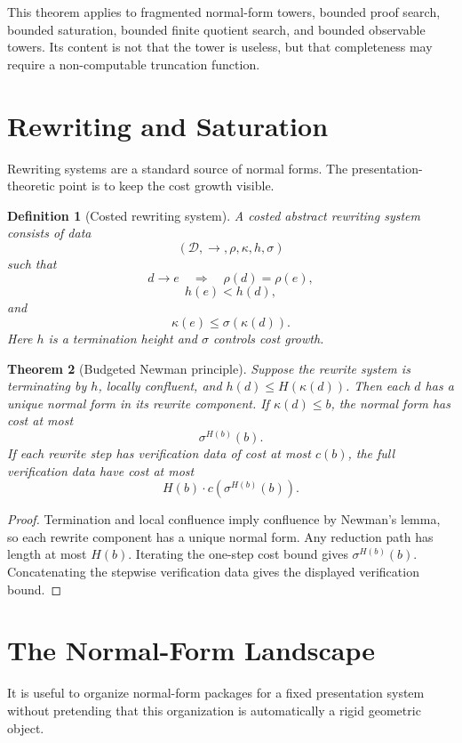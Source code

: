 \documentclass[11pt]{article}
\newtheorem{theorem}{Theorem}[section]
\newtheorem{definition}[theorem]{Definition}
\begin{document}
This theorem applies to fragmented normal-form towers, bounded proof search, bounded saturation, bounded finite quotient search, and bounded observable towers. Its content is not that the tower is useless, but that completeness may require a non-computable truncation function.

\section{Rewriting and Saturation}

Rewriting systems are a standard source of normal forms. The presentation-theoretic point is to keep the cost growth visible.

\begin{definition}[Costed rewriting system]
A costed abstract rewriting system consists of data
\[
(\mathcal D,\to,\rho,\kappa,h,\sigma)
\]
such that
\[
d\to e\quad\Longrightarrow\quad \rho(d)=\rho(e),
\]
\[
h(e)<h(d),
\]
and
\[
\kappa(e)\leq \sigma(\kappa(d)).
\]
Here \(h\) is a termination height and \(\sigma\) controls cost growth.
\end{definition}

\begin{theorem}[Budgeted Newman principle]
Suppose the rewrite system is terminating by \(h\), locally confluent, and \(h(d)\leq H(\kappa(d))\). Then each \(d\) has a unique normal form in its rewrite component. If \(\kappa(d)\leq b\), the normal form has cost at most
\[
\sigma^{H(b)}(b).
\]
If each rewrite step has verification data of cost at most \(c(b)\), the full verification data have cost at most
\[
H(b)\cdot c(\sigma^{H(b)}(b)).
\]
\end{theorem}

\begin{proof}
Termination and local confluence imply confluence by Newman's lemma, so each rewrite component has a unique normal form. Any reduction path has length at most \(H(b)\). Iterating the one-step cost bound gives \(\sigma^{H(b)}(b)\). Concatenating the stepwise verification data gives the displayed verification bound.
\end{proof}

\section{The Normal-Form Landscape}

It is useful to organize normal-form packages for a fixed presentation system without pretending that this organization is automatically a rigid geometric object.
\end{document}
